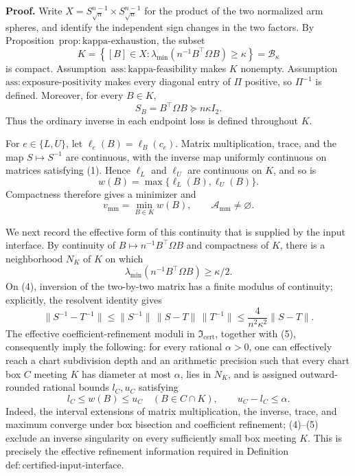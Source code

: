 \textbf{Proof.}
Write \(X=S^{n-1}_{\sqrt n}\times S^{n-1}_{\sqrt n}\) for the product of the two normalized arm spheres, and identify the independent sign changes in the two factors.  By Proposition~\(\mathrm{prop{:}kappa\mbox{-}exhaustion}\), the subset
\[
 K=\left\{[B]\in X:\lambda_{\min}\!\left(n^{-1}B^{\top}\Omega B\right)\geq\kappa\right\}
 =\mathcal B_\kappa
\]
is compact.  Assumption~\(\mathrm{ass{:}kappa\mbox{-}feasibility}\) makes \(K\) nonempty.  Assumption~\(\mathrm{ass{:}exposure\mbox{-}positivity}\) makes every diagonal entry of \(\Pi\) positive, so \(\Pi^{-1}\) is defined.  Moreover, for every \(B\in K\),
\[
 S_B=B^{\top}\Omega B\succeq n\kappa I_2. \tag{1}
\]
Thus the ordinary inverse in each endpoint loss is defined throughout \(K\).

For \(e\in\{L,U\}\), let \(\ell_e(B)=\ell_B(c_e)\).  Matrix multiplication, trace, and the map \(S\mapsto S^{-1}\) are continuous, with the inverse map uniformly continuous on matrices satisfying (1).  Hence \(\ell_L\) and \(\ell_U\) are continuous on \(K\), and so is
\[
 w(B)=\max\{\ell_L(B),\ell_U(B)\}. \tag{2}
\]
Compactness therefore gives a minimizer and
\[
 v_{\mathrm{mm}}=\min_{B\in K}w(B),
 \qquad
 \mathcal A_{\mathrm{mm}}\neq\varnothing. \tag{3}
\]

We next record the effective form of this continuity that is supplied by the input interface.  By continuity of \(B\mapsto n^{-1}B^{\top}\Omega B\) and compactness of \(K\), there is a neighborhood \(N_K\) of \(K\) on which
\[
 \lambda_{\min}\!\left(n^{-1}B^{\top}\Omega B\right)\geq\kappa/2. \tag{4}
\]
On (4), inversion of the two-by-two matrix has a finite modulus of continuity; explicitly, the resolvent identity gives
\[
 \lVert S^{-1}-T^{-1}\rVert
 \leq \lVert S^{-1}\rVert\,\lVert S-T\rVert\,\lVert T^{-1}\rVert
 \leq \frac{4}{n^2\kappa^2}\lVert S-T\rVert. \tag{5}
\]
The effective coefficient-refinement moduli in \(\mathfrak I_{\mathrm{cert}}\), together with (5), consequently imply the following: for every rational \(\alpha>0\), one can effectively reach a chart subdivision depth and an arithmetic precision such that every chart box \(C\) meeting \(K\) has diameter at most \(\alpha\), lies in \(N_K\), and is assigned outward-rounded rational bounds \(l_C,u_C\) satisfying
\[
 l_C\leq w(B)\leq u_C\quad(B\in C\cap K),
 \qquad
 u_C-l_C\leq\alpha. \tag{6}
\]
Indeed, the interval extensions of matrix multiplication, the inverse, trace, and maximum converge under box bisection and coefficient refinement; (4)--(5) exclude an inverse singularity on every sufficiently small box meeting \(K\).  This is precisely the effective refinement information required in Definition~\(\mathrm{def{:}certified\mbox{-}input\mbox{-}interface}\).

